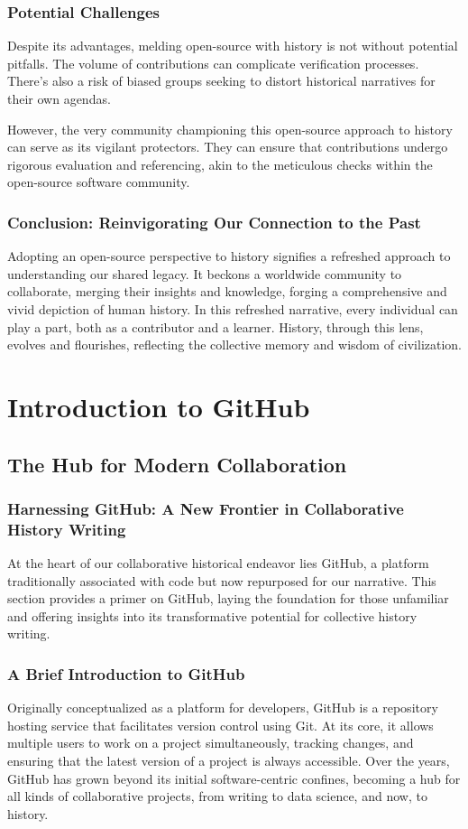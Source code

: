 \documentclass[a4paper,12pt]{book}
\begin{document}
\subsection*{Potential Challenges}
Despite its advantages, melding open-source with history is not without potential pitfalls. The volume of contributions can complicate verification processes. There's also a risk of biased groups seeking to distort historical narratives for their own agendas.

However, the very community championing this open-source approach to history can serve as its vigilant protectors. They can ensure that contributions undergo rigorous evaluation and referencing, akin to the meticulous checks within the open-source software community.

\subsection*{Conclusion: Reinvigorating Our Connection to the Past}
Adopting an open-source perspective to history signifies a refreshed approach to understanding our shared legacy. It beckons a worldwide community to collaborate, merging their insights and knowledge, forging a comprehensive and vivid depiction of human history. In this refreshed narrative, every individual can play a part, both as a contributor and a learner. History, through this lens, evolves and flourishes, reflecting the collective memory and wisdom of civilization.

\chapter{Introduction to GitHub}
\section*{The Hub for Modern Collaboration}
\subsection*{Harnessing GitHub: A New Frontier in Collaborative History Writing}
At the heart of our collaborative historical endeavor lies GitHub, a platform traditionally associated with code but now repurposed for our narrative. This section provides a primer on GitHub, laying the foundation for those unfamiliar and offering insights into its transformative potential for collective history writing.

\subsection*{A Brief Introduction to GitHub}
Originally conceptualized as a platform for developers, GitHub is a repository hosting service that facilitates version control using Git. At its core, it allows multiple users to work on a project simultaneously, tracking changes, and ensuring that the latest version of a project is always accessible. Over the years, GitHub has grown beyond its initial software-centric confines, becoming a hub for all kinds of collaborative projects, from writing to data science, and now, to history.
\end{document}
